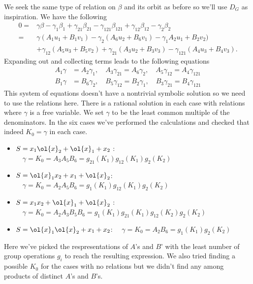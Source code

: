 We seek the same type of relation on $\beta$ and its orbit as before so we'll use $D_G$ as inspiration. We have the following
\begin{align*}
0=&\gamma\beta-\gamma_{1}\beta_{1}+\gamma_{21}\beta_{21}-\gamma_{121}\beta_{121}+\gamma_{12}\beta_{12}-\gamma_{2}\beta_{2}\\
	=&\gamma (A_1 u_1 + B_1 v_1) - \gamma_{2} (A_6 u_2 + B_6 v_1) - \gamma_{1} A_2 u_1 + B_2 v_2) \\&+  \gamma_{12} (A_5 u_3 + B_5 v_2) + \gamma_{21}(A_3 u_2 + B_3 v_3) - \gamma_{121} (A_4 u_3 + B_4 v_3).
\end{align*}
Expanding out and collecting terms leads to the following equations
\begin{align*}
	 A_1 \gamma&= A_2 \gamma_{1},   \quad A_3 \gamma_{21} = A_6 \gamma_{2}, \quad A_5 \gamma_{12} = A_4 \gamma_{121}\\
	 B_1 \gamma &= B_6\gamma_{2},  \quad  B_5 \gamma_{12}= B_2 \gamma_{1},  \quad B_3 \gamma_{21} = B_4 \gamma_{121}
\end{align*}
This system of equations doesn't have a nontrivial symbolic solution so we need to use the relations here. There is a rational solution in each case with relations where $\gamma$ is a free variable. We set $\gamma$ to be the least common multiple of the denominators. In the six cases we've performed the calculations and checked that indeed $K_0 = \gamma$ in each case.
\begin{itemize}
\item $S = x_1\ol{x}_2+\ol{x}_1+x_2$ : $\quad\gamma = K_0 =  A_3 A_5 B_6 = g_{21}(K_1) g_{12}(K_1) g_{2}(K_2)$
\item $S = \ol{x}_1x_2 + x_1 + \ol{x}_2$:   $\quad\gamma = K_0 =  A_2 A_5 B_6 = g_{1}(K_1) g_{12}(K_1) g_{2}(K_2)$
\item $S = x_1 x_2+\ol{x}_1+\ol{x}_2$ :  $\quad\gamma = K_0 =  A_2 A_3 B_5 B_6 = g_{1}(K_1) g_{21}(K_1) g_{12}(K_2) g_{2}(K_2)$
\item $S = \ol{x}_1\ol{x}_2 + x_1 + x_2$:  $\quad\gamma = K_0 =  A_2 B_6 = g_{1}(K_1) g_{2}(K_2)$
\end{itemize}
Here we've picked the respresentations of $A$'s and $B$' with the least number of group operations $g_i$ to reach the resulting expression. We also tried finding a possible $K_0$ for the cases with no relations but we didn't find any among products of distinct $A$'s and $B$'s.
